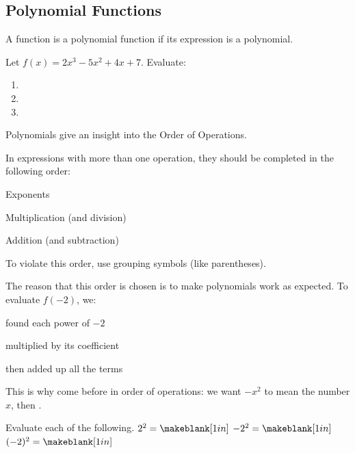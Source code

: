 \subsection{Polynomial Functions} 
\begin{definition}
A function is a polynomial function if its expression is a polynomial.
\end{definition}
\begin{Example}
Let $f(x)=2x^3-5x^2+4x+7$. Evaluate:
\begin{enumerate}\setabc
\item {}
\item {}
\item {}
\end{enumerate}
\end{Example}
Polynomials give an insight into the Order of Operations.
\begin{definition}
In expressions with more than one operation, they should be completed in the following order:
\begin{enumerate*}
\item Exponents
\item Multiplication (and division)
\item Addition (and subtraction)
\end{enumerate*}
To violate this order, use grouping symbols (like parentheses).
\end{definition}
The reason that this order is chosen is to make polynomials work as expected. To evaluate $f(-2)$, we:
\begin{enumerate*}
\item found each power of $-2$
\item multiplied by its coefficient
\item then added up all the terms
\end{enumerate*}
This is why \makeblank[1.25in] come before \makeblank[1.25in] in order of operations: we want $-x^2$ to mean \makeblank[1.25in] the number $x$, then \makeblank[1.25in].
\begin{Example}
Evaluate each of the following.\lbr
$2^2=\makeblank[1in]$\hfill
$-2^2=\makeblank[1in]$\hfill
$(-2)^2=\makeblank[1in]$\hfill
\end{Example}